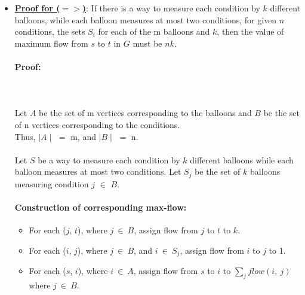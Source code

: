 \documentclass[pdftex,a4paper,12pt]{report}
\begin{document}
\begin{itemize}
\item \textbf{\underline{Proof for ($=>$)}}: If there is a way to measure each condition by $k$ different balloons, while each balloon measures at most two conditions, for given $n$ conditions, the sets $S_i$ for each of the m balloons and $k$, then the value of maximum flow from $s$ to $t$ in $G$ must be $nk$.
\paragraph{Proof:} \makebox[2pt]{}\\\\
Let $A$ be the set of m vertices corresponding to the balloons and $B$ be the set of n vertices corresponding to the conditions.\\
Thus, $\mid A \mid$ $=$ m, and $\mid B \mid$ $=$ n.\\\\
Let $S$ be a way to measure each condition by $k$ different balloons while each balloon measures at most two conditions. Let $S_j$ be the set of $k$ balloons measuring condition $j$ $\in$ $B$.
\paragraph{Construction of corresponding max-flow:} 
    \begin{itemize}
    \item For each ($j$, $t$), where $j\ \in\ B$, assign flow from $j$ to $t$ to $k$.
    \item For each ($i$, $j$), where $j\ \in\ B$, and $i\ \in\ S_j$, assign flow from $i$ to $j$ to 1.
    \item For each ($s$, $i$), where $i\ \in\ A$, assign flow from $s$ to $i$ to $\sum _j flow(i,\ j)$ where $j\ \in\ B$.
    \end{itemize}


\end{itemize}
\end{document}
